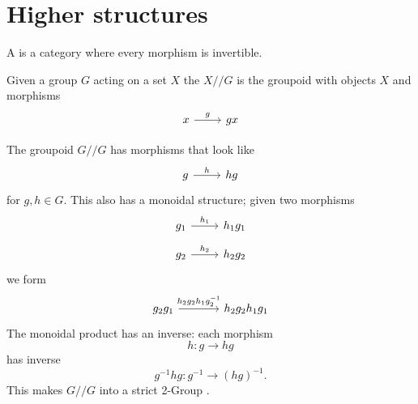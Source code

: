 \documentclass[12pt]{article}
\begin{document}
%
%

\section{Higher structures}


A  is a category where every morphism is invertible.

Given a group $G$ acting on a set $X$
the  $X//G$
is the groupoid with objects $X$ and morphisms
\[\begin{tikzcd} x \arrow{r}{g} & gx \end{tikzcd} \]

The groupoid $G//G$ has morphisms that look like
\[\begin{tikzcd} g \arrow{r}{h} & hg \end{tikzcd} \]
for $g, h\in G.$
This also has a monoidal structure; given two
morphisms
\[\begin{tikzcd}[row sep=small]
g_1 \arrow{r}{h_1} & h_1g_1 \\
g_2 \arrow{r}{h_2} & h_2g_2
\end{tikzcd} \]
we form
\[\begin{tikzcd}[row sep=large, column sep = large]
g_2 g_1 \arrow{r}{h_2 g_2 h_1 g_2^{-1}} & h_2 g_2 h_1 g_1 
\end{tikzcd} \]
The monoidal product has an inverse: 
each morphism 
$$h:g\to hg$$ 
has inverse 
$$g^{-1}hg : g^{-1}\to (hg)^{-1}.$$
This makes $G//G$ into a strict 2-Group \cite{Roberts2007}.

\def\bdy{\partial}
\end{document}
